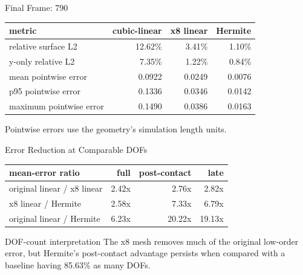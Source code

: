 \documentclass[aspectratio=169,10pt]{beamer}
\newcommand{\pct}[1]{#1\%}
\newcommand{\good}[1]{\textcolor{pgoGreen}{#1}}
\begin{document}
\begin{frame}{Final Frame: 790}
  \small
  \begin{table}
    \centering
    \begin{tabular}{lrrr}
      \toprule
      metric & cubic-linear & x8 linear & Hermite \\
      \midrule
      relative surface L2 & \pct{12.62} & \pct{3.41} & \good{\pct{1.10}} \\
      y-only relative L2 & \pct{7.35} & \pct{1.22} & \good{\pct{0.84}} \\
      mean pointwise error & 0.0922 & 0.0249 & \good{0.0076} \\
      p95 pointwise error & 0.1336 & 0.0346 & \good{0.0142} \\
      maximum pointwise error & 0.1490 & 0.0386 & \good{0.0163} \\
      \bottomrule
    \end{tabular}
  \end{table}

  \vspace{0.5em}
  Pointwise errors use the geometry's simulation length units.
\end{frame}

\begin{frame}{Error Reduction at Comparable DOFs}
  \small
  \begin{table}
    \centering
    \begin{tabular}{lrrr}
      \toprule
      mean-error ratio & full & post-contact & late \\
      \midrule
      original linear / x8 linear & 2.42x & 2.76x & 2.82x \\
      x8 linear / Hermite & 2.58x & \good{7.33x} & \good{6.79x} \\
      original linear / Hermite & 6.23x & \good{20.22x} & \good{19.13x} \\
      \bottomrule
    \end{tabular}
  \end{table}

  \vspace{0.7em}
  \begin{block}{DOF-count interpretation}
    The x8 mesh removes much of the original low-order error, but Hermite's
    post-contact advantage persists when compared with a baseline having
    85.63\% as many DOFs.
  \end{block}
\end{frame}
\end{document}
